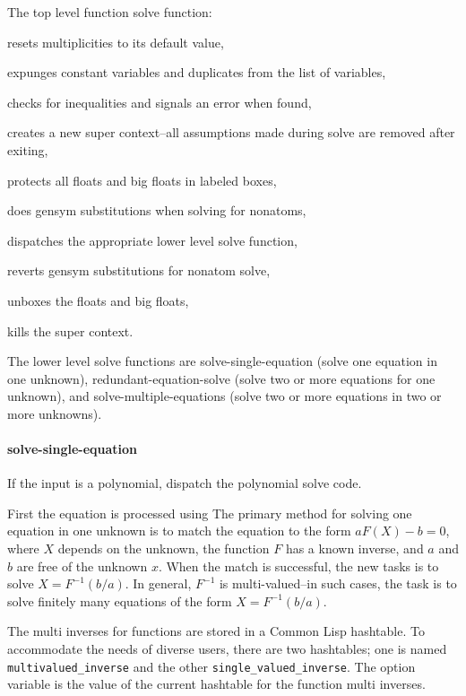 \documentclass[]{scrartcl}
\newcommand{\multivaluedinverse}{\texttt{multivalued\_inverse}}
\newcommand{\singlevaluedinverse}{\texttt{single\_valued\_inverse}}
\newcommand{\solveinversepackage}{\textt{solve\_inverse\_package}}
\begin{document}
 The top level function solve function:
 \begin{alphalist}[noitemsep]
   \item resets multiplicities to its default value,
   \item expunges constant variables and duplicates from the list of variables,
   \item checks for inequalities and signals an error when found,
   \item creates a new super context--all assumptions made during solve are removed after exiting,
   \item protects all floats and big floats in labeled boxes,
   \item does gensym substitutions when solving for nonatoms,
   \item dispatches the appropriate lower level solve function,
   \item reverts gensym substitutions for nonatom solve,
   \item unboxes the floats and big floats,
   \item kills the super context.
\end{alphalist}

The lower level solve functions are solve-single-equation (solve one equation in one unknown), redundant-equation-solve (solve two or more equations for one unknown), and solve-multiple-equations (solve two or more equations in two or more unknowns).


\paragraph{solve-single-equation} If the input is a polynomial, dispatch the polynomial solve code.

First the equation is processed using
The primary method for solving one equation in one unknown is to match the equation to the form \(a F(X) - b = 0\), where \(X\) depends on the unknown, the function \(F\) has a known inverse, and \(a\) and \(b\) are free of the unknown \(x\). When the match is successful, the new tasks is to solve \(X = F^{-1}(b/a) \). In general, \(F^{-1}\) is multi-valued--in such cases, the task is to solve finitely many equations of the form  \(X = F^{-1}(b/a) \).

The multi inverses for functions are stored in a Common Lisp hashtable. To accommodate the needs of diverse users, there are two hashtables; one is named \multivaluedinverse\/ and the other \singlevaluedinverse.  The option variable \solveinversepackage\/ is the value of the current hashtable for the function multi inverses.
\end{document}

